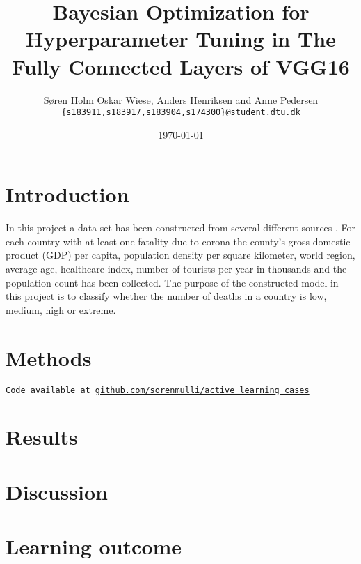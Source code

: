 \documentclass[12pt,fleqn]{article}
\title{\vspace*{-3.75cm}Bayesian Optimization for Hyperparameter Tuning in The Fully Connected Layers of VGG16}
\author{Søren Holm Oskar Wiese, Anders Henriksen and Anne Pedersen \\
	\small {\texttt{\{s183911,s183917,s183904,s174300\}@student.dtu.dk}}}
\date{\today}
\begin{document}
	
	\maketitle
	
	
	\begin{abstract}
		
	\end{abstract}
	
		
		
		\section{Introduction} 
		
		In this project a data-set has been constructed from several different sources \cite{density, corona, alder, bnp, region, healthcare, turist}. For each country with at least one fatality due to corona the county's gross domestic product (GDP) per capita, population density per square kilometer, world region, average age, healthcare index, number of tourists per year in thousands and the population count has been collected. The purpose of the constructed model in this project is to classify whether the number of deaths in a country is low, medium, high or extreme.
		

		\section{Methods}
			
			\texttt{Code available at \url{github.com/sorenmulli/active_learning_cases}}
		
		

	\section{Results}
		
	

		\section{Discussion}
			
		\section{Learning outcome}
			
\end{document}
